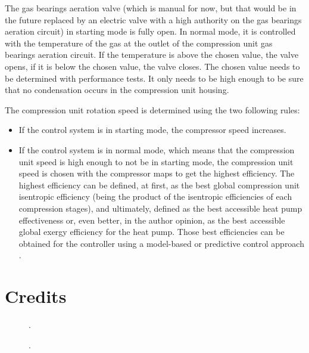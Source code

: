 The gas bearings aeration valve (which is manual for now, but that
would be in the future replaced by an electric valve with a high
authority on the gas bearings aeration circuit) in
starting mode is fully open. In normal mode, it is controlled with the
temperature of the gas at the outlet of the compression unit gas
bearings aeration circuit. If the temperature is above the chosen
value, the valve opens, if it is below the chosen value, the valve
closes. The chosen value needs to be determined with performance tests. It only needs to be high enough to be sure that no condensation
occurs in the compression unit housing.

The compression unit rotation speed is determined using the two following rules:

\begin{itemize}
\item If the control system is in starting mode, the compressor speed
  increases.
\item If the control system is in normal mode, which means that the
  compression unit speed is high enough to not be in starting mode,
  the compression unit speed is chosen with the compressor maps to get
  the highest efficiency. The highest efficiency can be defined, at
  first, as the best global compression unit isentropic efficiency
  (being the product of the isentropic efficiencies of each
  compression stages), and ultimately, defined as the best accessible
  heat pump effectiveness or, even better, in the author opinion, as
  the best accessible global exergy efficiency for the heat
  pump. Those best efficiencies can be
  obtained for the controller using a model-based or predictive
  control approach \citep{Fallahsohi-LinShi-2010a}.
\end{itemize}

\FloatBarrier


\label{sec:awp-refs}

\section*{Credits}
\label{sec:awp-credits}

\begin{description}
\item[] .
\item[] .
\end{description}
